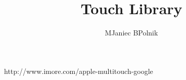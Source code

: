 \documentclass[10pt,a4paper]{article}
\author{MJaniec BPolnik}
\title{Touch Library}
\begin{document}
\maketitle

http://www.imore.com/apple-multitouch-google
\end{document}
